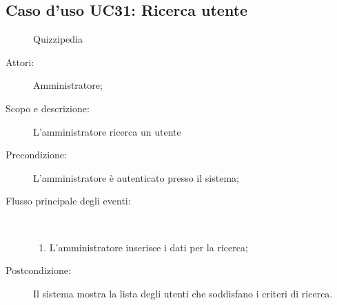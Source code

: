 \subsection{Caso d'uso UC31: Ricerca utente}
	\begin{figure}[H]
		\centering
		\begin{resizedtikzpicture}{\textwidth}
		\begin{umlsystem}[x=0, fill=lightgray!20]{Quizzipedia}
		\end{umlsystem}
		\end{resizedtikzpicture}
		\caption{}
	\end{figure}
\begin{description}
\item[Attori:] Amministratore;
\item[Scopo e descrizione:] L'amministratore ricerca un utente
      \item[Precondizione:] L'amministratore è autenticato presso il sistema;

        \item[Flusso principale degli eventi:] \ 
 \begin{enumerate}
          \item L'amministratore inserisce i dati per la ricerca;

      \end{enumerate}
    \item[Postcondizione:] Il sistema mostra la lista degli utenti che soddisfano i criteri di ricerca.
  \end{description}
\hypertarget{UC32}{}
